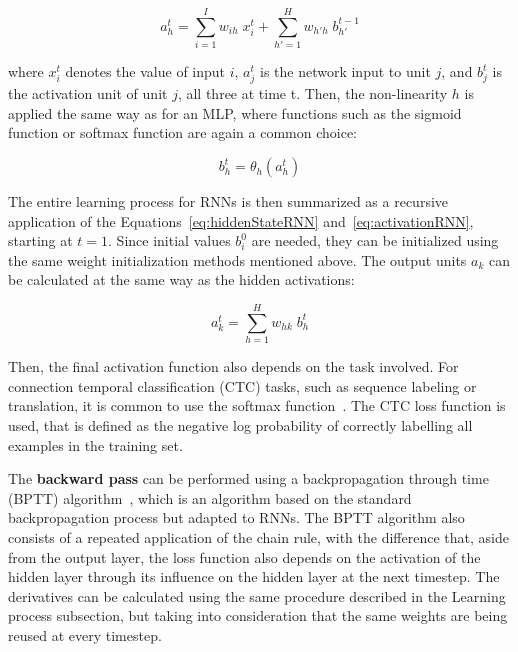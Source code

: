 \begin{equation} \label{eq:hiddenStateRNN}
    a_h^t = \sum_{i=1}^I w_{ih} \; x_i^t + \sum_{h'=1}^H w_{h'h} \; b_{h'}^{t-1}	
\end{equation}

where $x_i^t$ denotes the value of input $i$, $a_j^t$ is the network input to unit $j$, and 
$b_j^t$ is the activation unit of unit $j$, all three at time t. Then, the non-linearity $h$ 
is applied the same way as for an MLP, where functions such as the sigmoid function or 
softmax function are again a common choice:

\begin{equation} \label{eq:activationRNN}
    b_h^t = \theta_h(a_h^t)
\end{equation}

The entire learning process for RNNs is then summarized as a recursive application of the 
Equations~\ref{eq:hiddenStateRNN} and~\ref{eq:activationRNN}, starting at $t=1$. Since 
initial values $b_i^0$ are needed, they can be initialized using the same weight 
initialization methods mentioned above. The output units $a_k$ can be calculated at the same way 
as the hidden activations:

\begin{equation} \label{eq:hiddenStateRNN}
    a_k^t = \sum_{h=1}^H w_{hk} \; b_{h}^{t}	
\end{equation}

Then, the final activation function also depends on the task involved. For connection 
temporal classification (CTC) tasks, such as sequence labeling or translation, it is common 
to use the softmax function~\cite{appendix:graves2006connectionist}. The CTC loss function is 
used, that is defined as the negative log probability of correctly labelling all examples in 
the training set.

The \textbf{backward pass} can be performed using a backpropagation through time (BPTT) 
algorithm~\cite{appendix:williams1995gradient, semPar:werbos1990}, which is an algorithm 
based on the standard backpropagation process but adapted to RNNs. The BPTT algorithm also 
consists of a repeated application of the chain rule, with the difference that, aside from 
the output layer, the loss function also depends on the activation of the hidden layer 
through its influence on the hidden layer at the next timestep. The derivatives can be 
calculated using the same procedure described in the Learning process subsection, but taking 
into consideration that the same weights are being reused at every timestep.

